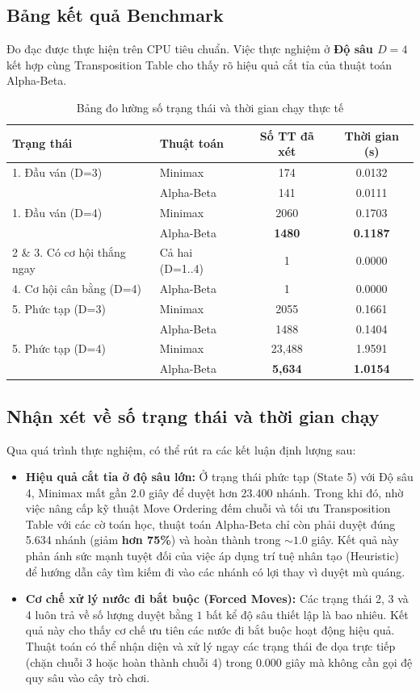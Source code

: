 \documentclass[13pt,a4paper]{article}
\begin{document}
\subsection{Bảng kết quả Benchmark}
Đo đạc được thực hiện trên CPU tiêu chuẩn. Việc thực nghiệm ở \textbf{Độ sâu $D=4$} kết hợp cùng Transposition Table cho thấy rõ hiệu quả cắt tỉa của thuật toán Alpha-Beta.

\begin{table}[h]
\centering
\begin{tabular}{llcc}
\toprule
\textbf{Trạng thái} & \textbf{Thuật toán} & \textbf{Số TT đã xét} & \textbf{Thời gian (s)} \\ \midrule
1. Đầu ván (D=3) & Minimax & 174 & 0.0132 \\
 & Alpha-Beta & 141 & 0.0111 \\ \midrule
1. Đầu ván (D=4) & Minimax & 2060 & 0.1703 \\
 & Alpha-Beta & \textbf{1480} & \textbf{0.1187} \\ \midrule
2 \& 3. Có cơ hội thắng ngay & Cả hai (D=1..4) & 1 & 0.0000 \\ \midrule
4. Cơ hội cân bằng (D=4) & Alpha-Beta & 1 & 0.0000 \\ \midrule
5. Phức tạp (D=3) & Minimax & 2055 & 0.1661 \\
 & Alpha-Beta & 1488 & 0.1404 \\ \midrule
5. Phức tạp (D=4) & Minimax & 23,488 & 1.9591 \\
 & Alpha-Beta & \textbf{5,634} & \textbf{1.0154} \\ \bottomrule
\end{tabular}
\caption{Bảng đo lường số trạng thái và thời gian chạy thực tế}
\end{table}

\subsection{Nhận xét về số trạng thái và thời gian chạy}
Qua quá trình thực nghiệm, có thể rút ra các kết luận định lượng sau:
\begin{itemize}
    \item \textbf{Hiệu quả cắt tỉa ở độ sâu lớn:} Ở trạng thái phức tạp (State 5) với Độ sâu 4, Minimax mất gần 2.0 giây để duyệt hơn 23.400 nhánh. Trong khi đó, nhờ việc nâng cấp kỹ thuật Move Ordering đếm chuỗi và tối ưu Transposition Table với các cờ toán học, thuật toán Alpha-Beta chỉ còn phải duyệt đúng 5.634 nhánh (giảm \textbf{hơn 75\%}) và hoàn thành trong $\sim 1.0$ giây. Kết quả này phản ánh sức mạnh tuyệt đối của việc áp dụng trí tuệ nhân tạo (Heuristic) để hướng dẫn cây tìm kiếm đi vào các nhánh có lợi thay vì duyệt mù quáng.
    \item \textbf{Cơ chế xử lý nước đi bắt buộc (Forced Moves):} Các trạng thái 2, 3 và 4 luôn trả về số lượng duyệt bằng $1$ bất kể độ sâu thiết lập là bao nhiêu. Kết quả này cho thấy cơ chế ưu tiên các nước đi bắt buộc hoạt động hiệu quả. Thuật toán có thể nhận diện và xử lý ngay các trạng thái đe dọa trực tiếp (chặn chuỗi 3 hoặc hoàn thành chuỗi 4) trong $0.000$ giây mà không cần gọi đệ quy sâu vào cây trò chơi.
\end{itemize}
\end{document}
